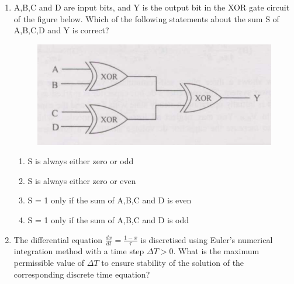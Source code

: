 \documentclass[journal,,12pt,onecolumn]{IEEEtran}
\theoremstyle{remark}
\begin{document}
\begin{enumerate}
\begin{enumerate}
\end{enumerate}
\bigskip
\item A,B,C and D are input bits, and Y is the output bit in the XOR gate circuit of the figure below. Which of the following statements about the sum S of A,B,C,D and Y is correct?
\begin{figure}[H]
   \centering
   \includegraphics[width=0.7\linewidth]{figs/fig_3.png}
   \label{stemplot}
\end{figure}
\begin{enumerate}
        \item S is always either zero or odd
        \item S is always either zero or even
        \item S = 1 only if the sum of A,B,C and D is even 
        \item S = 1 only if the sum of A,B,C and D is odd
\end{enumerate}
\bigskip
\item The differential equation $\frac{dx}{dt}=\frac{1-x}{\tau}$ is discretised using Euler's numerical integration method with a time step $\Delta T > 0$. What is the maximum permissible value of $\Delta T$ to ensure stability of the solution of the corresponding discrete time equation?


\end{enumerate}
\end{document}
